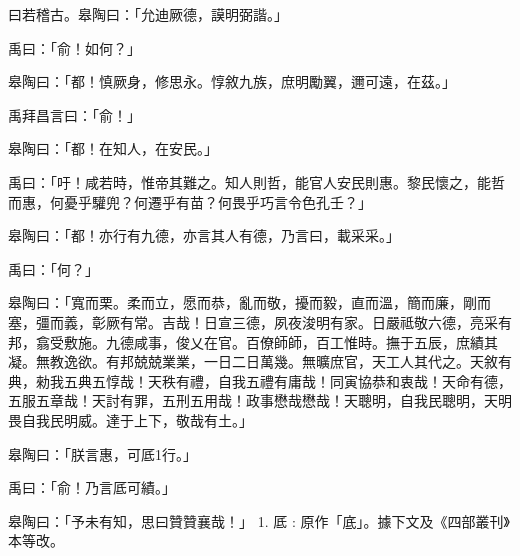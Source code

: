 
\begin{pinyinscope}
曰若稽古。皋陶曰：「允迪厥德，謨明弼諧。」

禹曰：「俞！如何？」

皋陶曰：「都！慎厥身，修思永。惇敘九族，庶明勵翼，邇可遠，在茲。」

禹拜昌言曰：「俞！」

皋陶曰：「都！在知人，在安民。」

禹曰：「吁！咸若時，惟帝其難之。知人則哲，能官人安民則惠。黎民懷之，能哲而惠，何憂乎驩兜？何遷乎有苗？何畏乎巧言令色孔壬？」

皋陶曰：「都！亦行有九德，亦言其人有德，乃言曰，載采采。」

禹曰：「何？」

皋陶曰：「寬而栗。柔而立，愿而恭，亂而敬，擾而毅，直而溫，簡而廉，剛而塞，彊而義，彰厥有常。吉哉！日宣三德，夙夜浚明有家。日嚴祗敬六德，亮采有邦，翕受敷施。九德咸事，俊乂在官。百僚師師，百工惟時。撫于五辰，庶績其凝。無教逸欲。有邦兢兢業業，一日二日萬幾。無曠庶官，天工人其代之。天敘有典，勑我五典五惇哉！天秩有禮，自我五禮有庸哉！同寅協恭和衷哉！天命有德，五服五章哉！天討有罪，五刑五用哉！政事懋哉懋哉！天聰明，自我民聰明，天明畏自我民明威。達于上下，敬哉有土。」

皋陶曰：「朕言惠，可厎1行。」

禹曰：「俞！乃言厎可績。」

皋陶曰：「予未有知，思曰贊贊襄哉！」 1. 厎 : 原作「底」。據下文及《四部叢刊》本等改。


\end{pinyinscope}